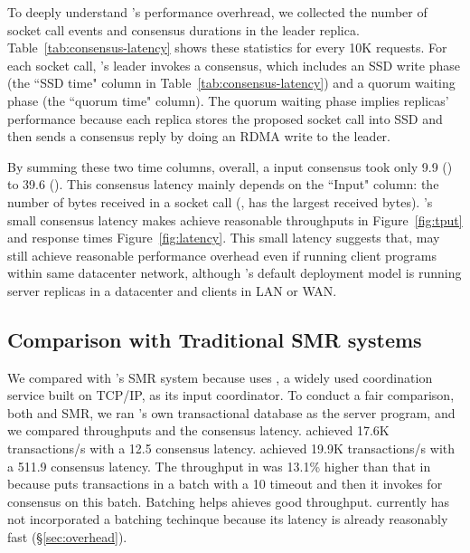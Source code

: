 
To deeply understand \xxx's performance overhread, we collected the number of 
socket call events and consensus durations in the leader replica. 
Table~\ref{tab:consensus-latency} shows these statistics for every 10K requests. 
For each socket call, \xxx's leader invokes a consensus, which includes an SSD 
write phase (the ``SSD time" column in Table~\ref{tab:consensus-latency}) and a 
quorum waiting phase (the ``quorum time" column). The quorum waiting phase 
implies replicas' performance because each replica stores the proposed socket 
call into SSD and then sends a consensus reply by doing an RDMA write to the 
leader. 

By summing these two time columns, overall, a \xxx input consensus took only 
9.9 \us (\redis) to 39.6 \us (\mongodb). This consensus latency mainly depends 
on the ``Input" column: the number of bytes received in a socket call (\eg, 
\mongodb has the largest received bytes). \xxx's small consensus latency makes 
\xxx achieve reasonable throughputs in Figure~\ref{fig:tput} and response times 
Figure~\ref{fig:latency}. This small latency suggests that, \xxx may still 
achieve reasonable performance overhead even if running client programs within 
same datacenter network, although \xxx's default deployment model is running 
server replicas in a datacenter and clients in LAN or WAN.

\subsection{Comparison with Traditional SMR systems} \label{sec:compare}

We compared \xxx with \calvin's SMR system because \calvin uses \zookeeper, a 
widely used coordination service built on TCP/IP, as its input coordinator. To 
conduct a fair comparison, both \xxx and \calvin SMR, we ran \calvin's own 
transactional database as the server program, and we compared throughputs and 
the consensus latency. \xxx achieved 17.6K transactions/s with a 12.5 \us 
consensus latency. \calvin achieved 19.9K transactions/s with a 511.9 \us 
consensus latency. The throughput in \calvin was 13.1\% higher than that in
\xxx because \calvin puts transactions in a batch with a 10 \ms timeout and 
then it invokes \zookeeper for consensus on this batch. Batching helps \calvin 
ahieves good throughput. \xxx currently has not incorporated a batching 
techinque because its latency is already reasonably fast 
(\S\ref{sec:overhead}).

